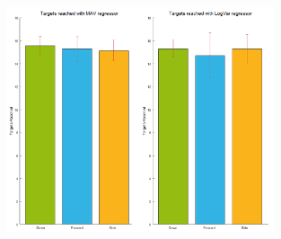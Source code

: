 \begin{figure}[H]
	\includegraphics[width=0.7\textwidth]{figures/results/TargetsReached}  %
	\caption{}
	\label{fig:TargetsReached}  %
\end{figure}